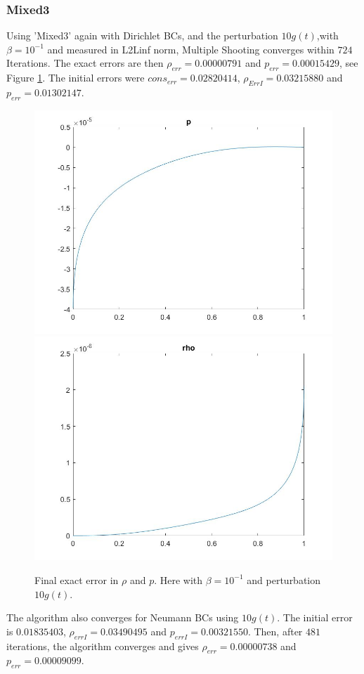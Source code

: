 \documentclass[11pt, a4paper]{article}
\theoremstyle{definition}
\begin{document}
\subsubsection*{Mixed3}
Using 'Mixed3' again with Dirichlet BCs, and the perturbation $10g(t)$,with $\beta=10^{-1}$ and measured in L2Linf norm, Multiple Shooting converges within $724$ Iterations. The exact errors are then $\rho_{err} = 0.00000791$ and $p_{err}=0.00015429$, see Figure \ref{Figlint5}. The initial errors were $cons_{err} = 0.02820414$, $\rho_{ErrI} = 0.03215880$ and $p_{err} = 0.01302147$. \\

\begin{figure}[h]
	\includegraphics[scale=0.3]{MultMD1.jpg}
	\includegraphics[scale=0.3]{MultMD2.jpg}
	\caption{Final exact error in $\rho$ and $p$. Here with $\beta =10^{-1}$ and perturbation $10g(t)$.}
	\label{Figlint5}
\end{figure}
The algorithm also converges for Neumann BCs using $10g(t)$. The initial error is $0.01835403$, $\rho_{errI} = 0.03490495$ and $p_{errI}= 0.00321550$. Then, after $481$ iterations, the algorithm converges and gives $\rho_{err} = 0.00000738$ and $p_{err}= 0.00009099$.
\end{document}
